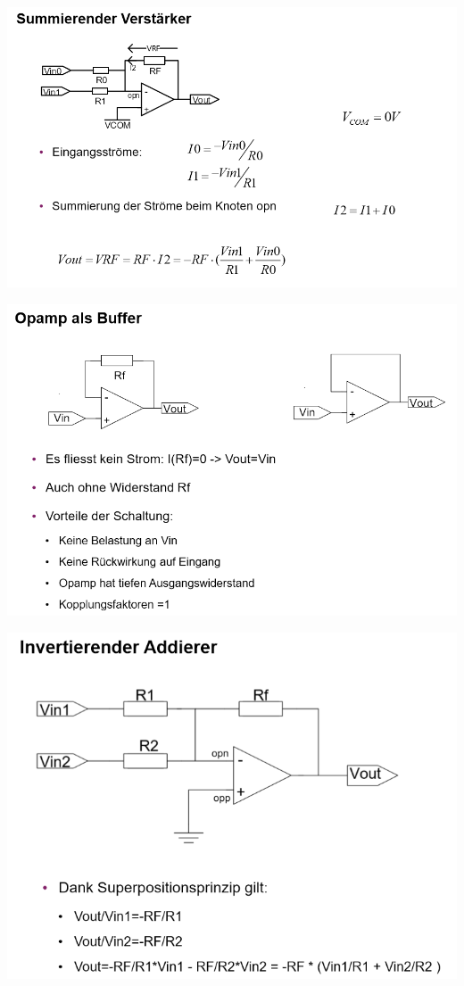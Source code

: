 \includegraphics[width=\linewidth]{Images/opamp_summierend}

\includegraphics[width=\linewidth]{Images/opamp_buffer}

\includegraphics[width=\linewidth]{Images/opamp_invertierend_addierer}

